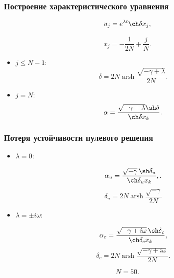 \documentclass[fullscreen=true, unicode, bookmarks=false]{beamer}
\DeclareMathOperator{\arsh}{arsh}
\begin{document}
\begin{frame}
\frametitle{ Построение характеристического уравнения }
 
$$ u_j = e^{\lambda t} \ch \delta x_j, $$

$$ x_j = -\dfrac{1}{2N} + \dfrac{j}{N}. $$

\bigskip
\pause

\begin{itemize}

\item { $ j \leqslant N-1: $ 
}
\begin{equation}
\delta = 2N \arsh \dfrac{\sqrt{-\gamma+\lambda}}{2N}.
\end{equation}
\medskip
\pause
\item { $ j = N: $ 
}
\begin{equation}
\alpha = \dfrac{\sqrt{-\gamma+\lambda}\sh\delta}{\ch\delta x_k}.
\end{equation}

\end{itemize}

\end{frame}

\begin{frame}
\frametitle{ Потеря устойчивости нулевого решения }

\begin{itemize}

\item { $ \lambda = 0: $ 
}

\begin{equation}
\alpha_u = \frac{ \sqrt{-\gamma} \, \sh \delta_u }{ \ch\delta_u x_k },.
\end{equation}
$$ \delta_u = 2N \arsh \dfrac{\sqrt{-\gamma}}{2N} $$

\medskip
\pause

\item { $ \lambda = \pm i \omega: \; $ 
}

\begin{equation}
\alpha_c = \frac{ \sqrt{-\gamma + i \omega} \, \sh \delta_c }{ \ch\delta_c x_k }, 
\end{equation}
$$ \delta_c = 2N \arsh \dfrac{\sqrt{-\gamma + i \omega}}{2N}. $$

\end{itemize}

\bigskip
\pause

$$ N = 50. $$	

\end{frame}
\end{document}
